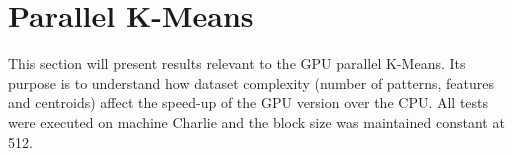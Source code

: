 \section{Parallel K-Means}
\label{sec:parallel kmeans}

This section will present results relevant to the GPU parallel K-Means.
Its purpose is to understand how dataset complexity (number of patterns, features and centroids) affect the speed-up of the GPU version over the CPU.
All tests were executed on machine Charlie and the block size was maintained constant at 512.




